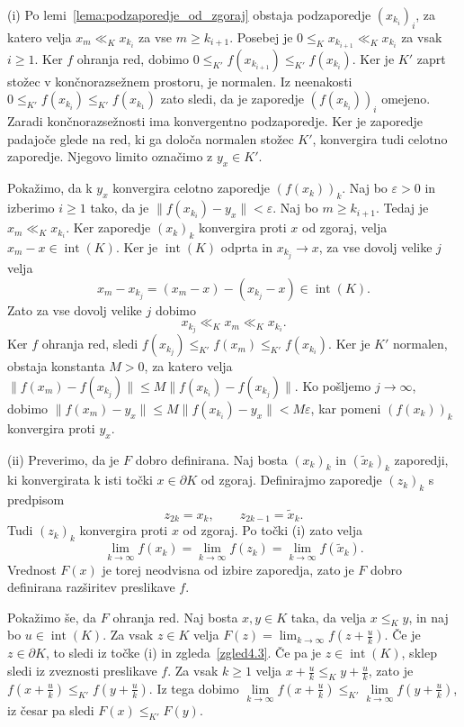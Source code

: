 \documentclass[mat2, tisk]{fmfdelo}
\begin{document}
\begin{dokaz}
(i) Po lemi~\ref{lema:podzaporedje_od_zgoraj} obstaja podzaporedje
$(x_{k_i})_i$, za katero velja $x_m\ll_K x_{k_i}$ za vse
$m\geq k_{i+1}$. Posebej je
$0\leq_K x_{k_{i+1}}\ll_K x_{k_i}$
za vsak $i\geq1$. Ker $f$ ohranja red, dobimo
$0\leq_{K'} f(x_{k_{i+1}}) \leq_{K'} f(x_{k_{i}})$.
Ker je $K'$ zaprt stožec v končnorazsežnem prostoru, je normalen.
Iz neenakosti
$0\leq_{K'}f(x_{k_i})\leq_{K'}f(x_{k_1})$
zato sledi, da je zaporedje $(f(x_{k_i}))_i$ omejeno.
Zaradi končnorazsežnosti ima konvergentno podzaporedje.
Ker je zaporedje padajoče glede na red, ki ga določa
normalen stožec $K'$, konvergira tudi celotno zaporedje.
Njegovo limito označimo z $y_x\in K'$.

Pokažimo, da k $y_x$ konvergira celotno zaporedje $(f(x_k))_k$.
Naj bo $\varepsilon>0$ in izberimo $i\geq1$ tako, da je $\|f(x_{k_i})-y_x\|<\varepsilon$.
Naj bo $m\geq k_{i+1}$. Tedaj je $x_m\ll_K x_{k_i}$.
Ker zaporedje $(x_k)_k$ konvergira proti $x$ od zgoraj,
velja $x_m-x\in\operatorname{int}(K)$. Ker je
$\operatorname{int}(K)$ odprta in $x_{k_j}\to x$,
za vse dovolj velike $j$ velja
\[
x_m-x_{k_j}
=(x_m-x)-(x_{k_j}-x)
\in\operatorname{int}(K).
\]
Zato za vse dovolj velike $j$ dobimo
\[
x_{k_j}\ll_K x_m\ll_K x_{k_i}.
\]
Ker $f$ ohranja red, sledi
$f(x_{k_j})\leq_{K'}f(x_m)\leq_{K'}f(x_{k_i})$.
Ker je $K'$ normalen, obstaja konstanta $M>0$, za katero velja
$\|f(x_m)-f(x_{k_j})\|
\leq M\|f(x_{k_i})-f(x_{k_j})\|$.
Ko pošljemo $j\to\infty$, dobimo
$\|f(x_m)-y_x\|
\leq
M\|f(x_{k_i})-y_x\|
<
M\varepsilon$, kar pomeni $(f(x_k))_k$ konvergira proti $y_x$.

(ii) Preverimo, da je $F$ dobro definirana. Naj bosta $(x_k)_k$ in
$(\widetilde{x}_k)_k$ zaporedji, ki konvergirata k isti točki
$x\in\partial K$ od zgoraj. Definirajmo zaporedje $(z_k)_k$ s
predpisom
\begin{equation*}
z_{2k}=x_k,
\qquad
z_{2k-1}=\widetilde{x}_k.
\end{equation*}
Tudi $(z_k)_k$ konvergira proti $x$ od zgoraj. Po točki (i) zato
velja
\begin{equation*}
\lim_{k\to\infty}f(x_k)
=
\lim_{k\to\infty}f(z_k)
=
\lim_{k\to\infty}f(\widetilde{x}_k).
\end{equation*}
Vrednost $F(x)$ je torej neodvisna od izbire zaporedja, zato je $F$
dobro definirana razširitev preslikave $f$.

Pokažimo še, da $F$ ohranja red. Naj bosta $x,y\in K$ taka, da velja
$x\leq_K y$, in naj bo $u\in\operatorname{int}(K)$.
Za vsak $z\in K$ velja
$F(z)=\lim_{k\to\infty}f\left(z+\frac{u}{k}\right)$.
Če je $z\in\partial K$, to sledi iz točke (i) in
zgleda~\ref{zgled4.3}. Če pa je
$z\in\operatorname{int}(K)$, sklep sledi iz
zveznosti preslikave $f$. Za vsak $k\geq1$ velja
$x+\frac{u}{k}
\leq_K
y+\frac{u}{k}$,
zato je
$f\left(x+\frac{u}{k}\right)
\leq_{K'}
f\left(y+\frac{u}{k}\right)$.
Iz tega dobimo 
$\lim\limits_{k\to\infty} f\left(x+\frac{u}{k}\right) \leq_{K'} \lim\limits_{k\to\infty} f\left(y+\frac{u}{k}\right)$, 
iz česar pa sledi $F(x)\leq_{K'}F(y)$.


\end{dokaz}
\end{document}
